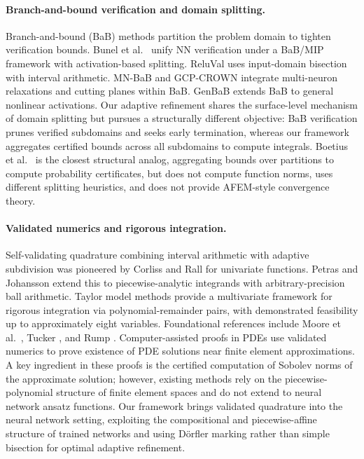 \documentclass[a4paper, 11pt]{article}
\begin{document}
\paragraph{Branch-and-bound verification and domain splitting.}
Branch-and-bound (BaB) methods partition the problem domain to tighten
verification bounds. Bunel et al.\ \cite{Bunel2020} unify NN verification under a
BaB/MIP framework with activation-based splitting. ReluVal \cite{Wang2018ReluVal}
uses input-domain bisection with interval arithmetic. MN-BaB \cite{Ferrari2022}
and GCP-CROWN \cite{Zhang2022GCP} integrate multi-neuron relaxations and cutting
planes within BaB. GenBaB \cite{Shi2024GenBaB} extends BaB to general nonlinear
activations. Our adaptive refinement shares the surface-level mechanism of domain
splitting but pursues a structurally different objective: BaB verification prunes
verified subdomains and seeks early termination, whereas our framework aggregates
certified bounds across all subdomains to compute integrals. Boetius et al.\
\cite{Boetius2025} is the closest structural analog, aggregating bounds over
partitions to compute probability certificates, but does not compute function
norms, uses different splitting heuristics, and does not provide AFEM-style convergence
theory.
 
\paragraph{Validated numerics and rigorous integration.}
Self-validating quadrature combining interval arithmetic with adaptive subdivision
was pioneered by Corliss and Rall \cite{CorlissRall1987} for univariate functions.
Petras \cite{Petras2002} and Johansson \cite{Johansson2018} extend this to
piecewise-analytic integrands with arbitrary-precision ball arithmetic. Taylor
model methods \cite{BerzMakino1998,BerzMakino2003} provide a multivariate
framework for rigorous integration via polynomial-remainder pairs, with
demonstrated feasibility up to approximately eight variables. Foundational
references include Moore et al.\ \cite{Moore2009}, Tucker \cite{Tucker2011}, and
Rump \cite{Rump2010}. Computer-assisted proofs in PDEs \cite{Nakao2019} use validated numerics to prove existence of PDE solutions near finite element approximations. A key ingredient in these proofs is the certified computation of Sobolev norms of the approximate solution; however, existing methods rely on the piecewise-polynomial structure of finite element spaces and do not extend to neural network ansatz functions. Our
framework brings validated quadrature into the neural network setting, exploiting
the compositional and piecewise-affine structure of trained networks and using
D\"{o}rfler marking \cite{Dorfler1996} rather than simple bisection for optimal
adaptive refinement.
 
\end{document}
